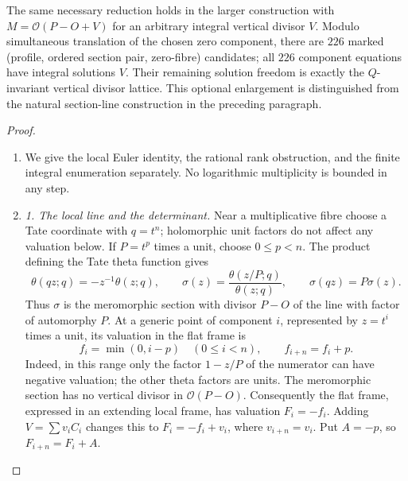 \begin{theorem}
The same necessary reduction holds in the larger construction with
$M=\mathcal O(P-O+V)$ for an arbitrary integral vertical divisor $V$.
Modulo simultaneous translation of the chosen zero component, there
are $226$ marked (profile, ordered section pair, zero-fibre) candidates;
all $226$ component equations have integral solutions $V$.
Their remaining solution freedom is exactly the $Q$-invariant vertical
divisor lattice. This optional enlargement is distinguished from the
natural section-line construction in the preceding paragraph.

\end{theorem}


\begin{proof}
\begin{enumerate}[label=\arabic*.,leftmargin=*]
\item We give the local Euler identity, the rational rank obstruction, and the
finite integral enumeration separately. No logarithmic multiplicity is
bounded in any step.

\item \emph{1. The local line and the determinant.}
Near a multiplicative fibre choose a Tate coordinate with $q=t^n$;
holomorphic unit factors do not affect any valuation below. If $P=t^p$
times a unit, choose $0\le p<n$. The product defining the Tate theta
function gives
\[
 \theta(qz;q)=-z^{-1}\theta(z;q),\qquad
 \sigma(z)=\frac{\theta(z/P;q)}{\theta(z;q)},\qquad
 \sigma(qz)=P\sigma(z).
\]
Thus $\sigma$ is the meromorphic section with divisor $P-O$ of the
line with factor of automorphy $P$. At a generic point of component
$i$, represented by $z=t^i$ times a unit, its valuation in the flat
frame is
\[
 f_i=\min(0,i-p)\quad(0\le i<n),\qquad f_{i+n}=f_i+p.
\]
Indeed, in this range only the factor $1-z/P$ of the numerator can
have negative valuation; the other theta factors are units. The
meromorphic section has no vertical divisor in $\mathcal O(P-O)$.
Consequently the flat frame, expressed in an extending local frame,
has valuation $F_i=-f_i$. Adding $V=\sum v_iC_i$ changes this to
$F_i=-f_i+v_i$, where $v_{i+n}=v_i$. Put $A=-p$, so
$F_{i+n}=F_i+A$.


\end{enumerate}
\end{proof}
